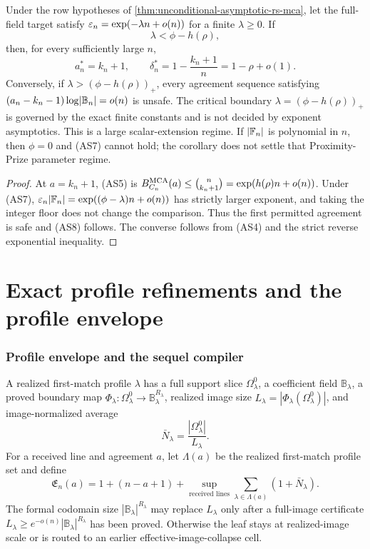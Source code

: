 \documentclass[11pt,a4paper]{amsart}
\numberwithin{equation}{section}
\theoremstyle{remark}
\newcommand{\F}{\mathbb F}\newcommand{\B}{\mathbb B}\newcommand{\K}{\mathbb K}\newcommand{\Z}{\mathbb Z}
\begin{document}
\begin{corollary}
\label{cor:unconditional-rs-mca-capacity}
Under the row hypotheses of
\cref{thm:unconditional-asymptotic-rs-mca}, let the full-field target
satisfy \(\varepsilon_n=\exp(-\lambda n+o(n))\) for a finite
\(\lambda\ge0\).  If
\[
                         \lambda<\phi-h(\rho),      \tag{AS7}
\]
then, for every sufficiently large \(n\),
\[
 a_n^*=k_n+1,\qquad
 \delta_n^*=1-\frac{k_n+1}{n}=1-\rho+o(1).         \tag{AS8}
\]
Conversely, if \(\lambda>(\phi-h(\rho))_+\), every agreement sequence
satisfying \((a_n-k_n-1)\log\abs{\B_n}=o(n)\) is unsafe.  The critical
boundary \(\lambda=(\phi-h(\rho))_+\) is governed by the
exact finite constants and is not decided by exponent asymptotics.  This
is a large scalar-extension regime.  If \(\abs{\F_n}\) is polynomial in
\(n\), then \(\phi=0\) and \textup{(AS7)} cannot hold; the corollary does
not settle that Proximity-Prize parameter regime.
\end{corollary}

\begin{proof}
At \(a=k_n+1\), \textup{(AS5)} is
\(B_{C_n}^{\rm MCA}(a)\le\binom n{k_n+1}
=\exp(h(\rho)n+o(n))\).  Under \textup{(AS7)},
\(\eps_n\abs{\F_n}=\exp((\phi-\lambda)n+o(n))\) has strictly larger
exponent, and taking the integer floor does not change the comparison.
Thus the first permitted agreement is safe
and \textup{(AS8)} follows.  The converse follows from \textup{(AS4)}
and the strict reverse exponential inequality.
\end{proof}


\part{Exact profile refinements and the profile envelope}
\section{Profile envelope and the sequel compiler}\label{sec:profile-envelope-compiler}
A realized first-match profile $\lambda$ has a full support slice $\Omega^0_\lambda$, a coefficient field $\B_\lambda$, a proved boundary map
$\Phi_\lambda:\Omega^0_\lambda\to\B_\lambda^{R_\lambda}$, realized image size
$L_\lambda=|\Phi_\lambda(\Omega^0_\lambda)|$, and image-normalized average
\[
 \bar N_\lambda=\frac{|\Omega^0_\lambda|}{L_\lambda}.
\]
For a received line and agreement $a$, let $\Lambda(a)$ be the realized first-match profile set and define
\begin{equation}
 \mathfrak E_n(a)=1+(n-a+1)+
 \sup_{\text{received lines}}\sum_{\lambda\in\Lambda(a)}(1+\bar N_\lambda).\label{eq:profile-envelope}
\end{equation}
The formal codomain size $|\B_\lambda|^{R_\lambda}$ may replace $L_\lambda$ only after a full-image certificate
$L_\lambda\ge e^{-o(n)}|\B_\lambda|^{R_\lambda}$ has been proved.  Otherwise the leaf stays at realized-image scale or is routed to an earlier effective-image-collapse cell.
\end{document}

